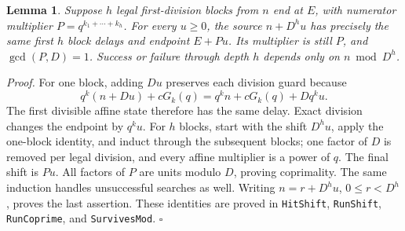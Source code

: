 \documentclass[11pt,letterpaper]{article}
\newtheorem{lemma}[theorem]{Lemma}
\newenvironment{proof}{\noindent\textit{Proof.}}{\hfill\(\square\)}
\begin{document}
\begin{lemma}\label{LemmaShift}
Suppose \(h\) legal first-division blocks from \(n\) end at \(E\),
with numerator multiplier \(P=q^{k_1+\cdots+k_h}\).
For every \(u\ge0\), the source \(n+D^hu\) has precisely the same
first \(h\) block delays and endpoint \(E+Pu\).
Its multiplier is still \(P\), and \(\gcd(P,D)=1\).
Success or failure through depth \(h\) depends only on \(n\bmod D^h\).
\end{lemma}
\begin{proof}
For one block, adding \(Du\) preserves each division guard because
\[
q^k(n+Du)+cG_k(q)=q^kn+cG_k(q)+Dq^ku.
\]
The first divisible affine state therefore has the same delay.
Exact division changes the endpoint by \(q^ku\).
For \(h\) blocks, start with the shift \(D^hu\), apply the one-block identity,
and induct through the subsequent blocks; one factor of \(D\) is removed
per legal division, and every affine multiplier is a power of \(q\).
The final shift is \(Pu\).
All factors of \(P\) are units modulo \(D\), proving coprimality.
The same induction handles unsuccessful searches as well.
Writing \(n=r+D^h u\), \(0\le r<D^h\), proves the last assertion.
These identities are proved in \texttt{HitShift}, \texttt{RunShift},
\texttt{RunCoprime}, and \texttt{SurvivesMod}.
\end{proof}
\end{document}
